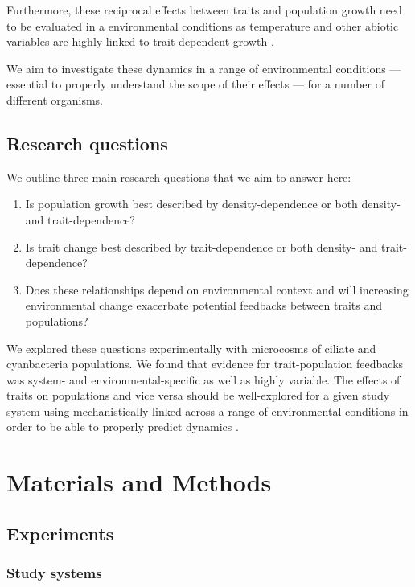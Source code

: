 \documentclass{getwriting}
\begin{document}
Furthermore, these reciprocal effects between traits and population growth need to be evaluated in a environmental conditions as temperature and other abiotic variables are highly-linked to trait-dependent growth \cite{Brown2004, Gillooly2001, Kremer2017a}. 

We aim to investigate these dynamics in a range of environmental conditions --- essential to properly understand the scope of their effects --- for a number of different organisms.

\subsection{Research questions}

We outline three main research questions that we aim to answer here:

\begin{enumerate}
    \item Is population growth best described by density-dependence or both density- and trait-dependence?
    \item Is trait change best described by trait-dependence or both density- and trait-dependence?
    \item Does these relationships depend on environmental context and will increasing environmental change exacerbate potential feedbacks between traits and populations?
\end{enumerate}

We explored these questions experimentally with microcosms of ciliate and cyanbacteria populations. We found that evidence for trait-population feedbacks was system- and environmental-specific as well as highly variable. The effects of traits on populations and vice versa should be well-explored for a given study system using mechanistically-linked across a range of environmental conditions in order to be able to properly predict dynamics \cite{Collins2022}.

\section{Materials and Methods}

\subsection{Experiments}

\subsubsection{Study systems}
\end{document}
